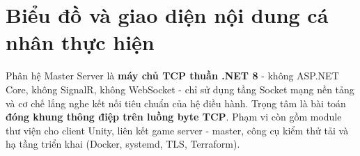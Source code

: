 
\section{Biểu đồ và giao diện nội dung cá nhân thực hiện}
Phân hệ Master Server là \textbf{máy chủ TCP thuần .NET 8} - không ASP.NET Core, không SignalR, không
WebSocket - chỉ sử dụng tầng Socket mạng nền tảng và cơ chế lắng nghe kết nối tiêu chuẩn của hệ điều hành. Trọng tâm là bài toán \textbf{đóng khung thông điệp trên
luồng byte TCP}. Phạm vi còn gồm module thư viện cho client Unity, liên kết game server - master,
công cụ kiểm thử tải và hạ tầng triển khai (Docker, systemd, TLS, Terraform).

